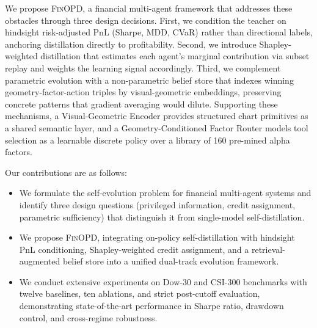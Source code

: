 We propose \textsc{FinOPD}, a financial multi-agent framework that addresses these obstacles through three design decisions. First, we condition the teacher on hindsight risk-adjusted PnL (Sharpe, MDD, CVaR) rather than directional labels, anchoring distillation directly to profitability. Second, we introduce Shapley-weighted distillation that estimates each agent's marginal contribution via subset replay and weights the learning signal accordingly. Third, we complement parametric evolution with a non-parametric belief store that indexes winning geometry-factor-action triples by visual-geometric embeddings, preserving concrete patterns that gradient averaging would dilute. Supporting these mechanisms, a Visual-Geometric Encoder provides structured chart primitives as a shared semantic layer, and a Geometry-Conditioned Factor Router models tool selection as a learnable discrete policy over a library of 160 pre-mined alpha factors.

Our contributions are as follows:
\begin{itemize}[leftmargin=*,nosep]
\item We formulate the self-evolution problem for financial multi-agent systems and identify three design questions (privileged information, credit assignment, parametric sufficiency) that distinguish it from single-model self-distillation.
\item We propose \textsc{FinOPD}, integrating on-policy self-distillation with hindsight PnL conditioning, Shapley-weighted credit assignment, and a retrieval-augmented belief store into a unified dual-track evolution framework.
\item We conduct extensive experiments on Dow-30 and CSI-300 benchmarks with twelve baselines, ten ablations, and strict post-cutoff evaluation, demonstrating state-of-the-art performance in Sharpe ratio, drawdown control, and cross-regime robustness.
\end{itemize}
